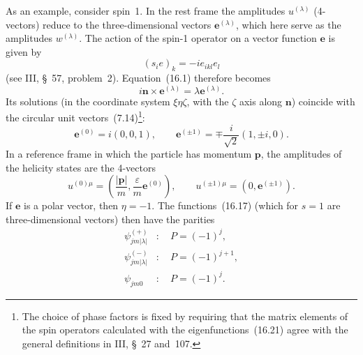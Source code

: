 As an example, consider spin~1. In the rest frame the amplitudes $u^{(\lambda)}$ (4-vectors) reduce to the three-dimensional vectors $\mathbf e^{(\lambda)}$, which here serve as the amplitudes $w^{(\lambda)}$. The action of the spin-1 operator on a vector function $\mathbf e$ is given by
\begin{equation}
(\widehat s_i e)_k=-ie_{ikl}e_l
\tag{16.19}
\end{equation}
(see III, \S~57, problem~2). Equation~(16.1) therefore becomes
\begin{equation}
i\mathbf n\times\mathbf e^{(\lambda)}=\lambda\mathbf e^{(\lambda)}.
\tag{16.20}
\end{equation}
Its solutions (in the coordinate system $\xi\eta\zeta$, with the $\zeta$ axis along $\mathbf n$) coincide with the circular unit vectors~(7.14)\footnote{The choice of phase factors is fixed by requiring that the matrix elements of the spin operators calculated with the eigenfunctions~(16.21) agree with the general definitions in III, \S~27 and~107.}:
\begin{equation}
\mathbf e^{(0)}=i(0,0,1),
\qquad
\mathbf e^{(\pm1)}=\mp\frac{i}{\sqrt2}(1,\pm i,0).
\tag{16.21}
\end{equation}
In a reference frame in which the particle has momentum $\mathbf p$, the amplitudes of the helicity states are the 4-vectors
\begin{equation}
u^{(0)\mu}=\left(\frac{|\mathbf p|}{m},\frac{\varepsilon}{m}\mathbf e^{(0)}\right),
\qquad
u^{(\pm1)\mu}=(0,\mathbf e^{(\pm1)}).
\tag{16.22}
\end{equation}
If $\mathbf e$ is a polar vector, then $\eta=-1$. The functions~(16.17) (which for $s=1$ are three-dimensional vectors) then have the parities
\[
\begin{aligned}
\psi^{(+)}_{jm|\lambda|}&:\quad P=(-1)^j,\\
\psi^{(-)}_{jm|\lambda|}&:\quad P=(-1)^{j+1},\\
\psi_{jm0}&:\quad P=(-1)^j.
\end{aligned}
\]


